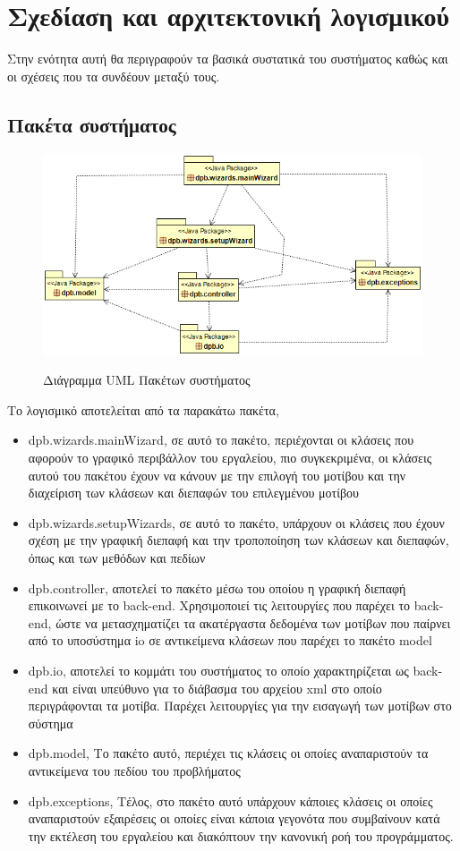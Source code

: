\chapter{Σχεδίαση και αρχιτεκτονική λογισμικού}
\label{ch:architecture}
Στην ενότητα αυτή θα περιγραφούν τα βασικά συστατικά του συστήματος
 καθώς και οι σχέσεις που τα συνδέουν μεταξύ τους.
\section{Πακέτα συστήματος}
\label{sec:packages}
\begin{figure}[H]
    \centering
    \includegraphics[width=1.0\textwidth]{Figures/packages.png}
    \label{fig:packageUML}
    \caption{Διάγραμμα UML Πακέτων συστήματος}
\end{figure}
Το λογισμικό αποτελείται από τα παρακάτω πακέτα,
\begin{itemize}
    \item dpb.wizards.mainWizard, σε αυτό το πακέτο, περιέχονται οι κλάσεις που αφορούν το γραφικό περιβάλλον του εργαλείου,
     πιο συγκεκριμένα, οι κλάσεις αυτού του πακέτου έχουν να κάνουν με την επιλογή του μοτίβου και την διαχείριση των κλάσεων και διεπαφών του 
     επιλεγμένου μοτίβου
    \item dpb.wizards.setupWizards, σε αυτό το πακέτο, υπάρχουν οι κλάσεις που έχουν σχέση με την γραφική διεπαφή και την τροποποίηση των κλάσεων και διεπαφών, 
    όπως και των μεθόδων και πεδίων
    \item dpb.controller, αποτελεί το πακέτο μέσω του οποίου η γραφική διεπαφή επικοινωνεί με το back-end. Χρησιμοποιεί τις λειτουργίες που παρέχει το back-end, 
    ώστε να  μετασχηματίζει τα ακατέργαστα δεδομένα των μοτίβων που παίρνει από το υποσύστημα io σε αντικείμενα κλάσεων που παρέχει το πακέτο model
    \item dpb.io, αποτελεί το κομμάτι του συστήματος το οποίο χαρακτηρίζεται ως back-end
     και είναι υπεύθυνο για το διάβασμα του αρχείου xml στο οποίο περιγράφονται τα μοτίβα. Παρέχει λειτουργίες για την εισαγωγή των μοτίβων στο σύστημα
    \item dpb.model, Το πακέτο αυτό, περιέχει τις κλάσεις οι οποίες αναπαριστούν τα αντικείμενα του πεδίου του προβλήματος
    \item dpb.exceptions, Τέλος, στο πακέτο αυτό υπάρχουν κάποιες κλάσεις οι οποίες αναπαριστούν εξαιρέσεις 
    οι οποίες είναι κάποια γεγονότα που συμβαίνουν κατά την εκτέλεση του εργαλείου και διακόπτουν την κανονική ροή του προγράμματος.
\end{itemize}
\newpage
